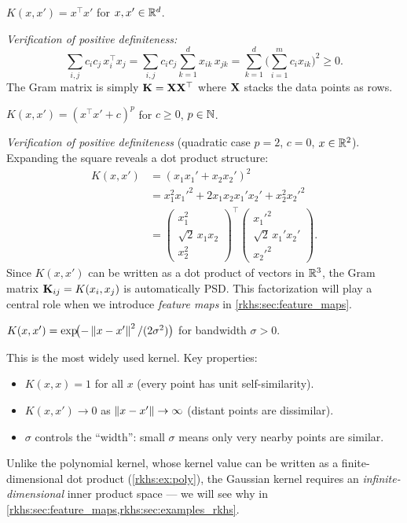\begin{notechapter}
\begin{example}
$K(x,x') = x^\top x'$ for $x, x' \in \mathbb{R}^d$.

\emph{Verification of positive definiteness:}
\[
\sum_{i,j} c_i c_j\, x_i^\top x_j = \sum_{i,j} c_i c_j
\sum_{k=1}^d x_{ik}\, x_{jk} = \sum_{k=1}^d
\biggl(\sum_{i=1}^m c_i x_{ik}\biggr)^{\!2} \geq 0.
\]
The Gram matrix is simply
$\mathbf{K} = \mathbf{X}\mathbf{X}^\top$ where $\mathbf{X}$ stacks
the data points as rows.
\end{example}

\begin{example}\label{rkhs:ex:poly}
$K(x,x') = (x^\top x' + c)^p$ for $c \geq 0$,
$p \in \mathbb{N}$.

\emph{Verification of positive definiteness} (quadratic
case $p = 2$, $c = 0$, $x \in \mathbb{R}^2$). Expanding the
square reveals a dot product structure:
\begin{align*}
K(x,x') &= (x_1 x_1' + x_2 x_2')^2 \\
&= x_1^2 {x_1'}^2 + 2 x_1 x_2 x_1' x_2'
  + x_2^2 {x_2'}^2 \\
&= \begin{pmatrix} x_1^2 \\ \sqrt{2}\, x_1 x_2
  \\ x_2^2 \end{pmatrix}^\top
\begin{pmatrix} {x_1'}^2 \\ \sqrt{2}\, x_1' x_2'
  \\ {x_2'}^2 \end{pmatrix}.
\end{align*}
Since $K(x,x')$ can be written as a dot product of
vectors in $\mathbb{R}^3$, the Gram matrix
$\mathbf{K}_{ij} = K(x_i,x_j)$ is automatically PSD.
This factorization will play a central role when we
introduce \emph{feature maps} in
\cref{rkhs:sec:feature_maps}.
\end{example}

\begin{example}
$K(x,x') = \exp\!\bigl(-\left\|x - x'\right\|^2 /
(2\sigma^2)\bigr)$ for bandwidth $\sigma > 0$.

This is the most widely used kernel. Key properties:
\begin{itemize}
  \item $K(x,x) = 1$ for all $x$ (every point has
    unit self-similarity).
  \item $K(x,x') \to 0$ as $\left\|x - x'\right\| \to \infty$
    (distant points are dissimilar).
  \item $\sigma$ controls the ``width'': small $\sigma$
    means only very nearby points are similar.
\end{itemize}
Unlike the polynomial kernel, whose kernel value can be
written as a finite-dimensional dot product (\cref{rkhs:ex:poly}),
the Gaussian kernel requires an
\emph{infinite-dimensional} inner product space --- we
will see why in \cref{rkhs:sec:feature_maps,rkhs:sec:examples_rkhs}.
\end{example}


\end{notechapter}
